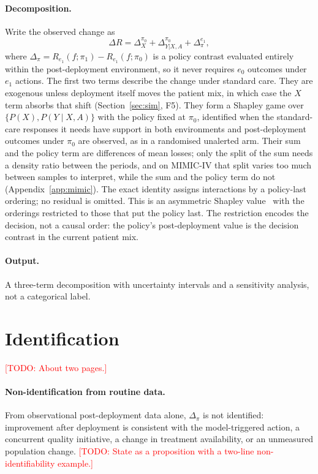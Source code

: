 \documentclass[letterpaper]{article} %
\newcommand{\todo}[1]{\textcolor{red}{[TODO: #1]}}
\begin{document}
\paragraph{Decomposition.} Write the observed change as
\begin{equation}
\Delta R = \Delta_X^{\pi_0} + \Delta_{Y|X,A}^{\pi_0}
          + \Delta_{\pi}^{e_1},
\label{eq:decomp}
\end{equation}
where $\Delta_\pi = R_{e_1}(f; \pi_1) - R_{e_1}(f; \pi_0)$ is a policy contrast
evaluated entirely within the post-deployment environment, so it never requires
$e_0$ outcomes under $e_1$ actions. The first two terms describe the change
under standard care. They are exogenous unless deployment itself moves the
patient mix, in which case the $X$ term absorbs that shift
(Section~\ref{sec:sim}, F5). They form a Shapley game over
$\{P(X), P(Y \mid X, A)\}$ with the policy fixed at $\pi_0$, identified when
the standard-care responses it needs have support in both environments and
post-deployment outcomes under $\pi_0$ are observed, as in a randomised
unalerted arm. Their sum and the policy term are differences of mean losses;
only the split of the sum needs a density ratio between the periods, and on
MIMIC-IV that split varies too much between samples to interpret, while the
sum and the policy term do not (Appendix~\ref{app:mimic}). The exact identity assigns interactions by a
policy-last ordering; no residual is omitted. This is an asymmetric Shapley
value~\citep{frye2020asymmetric} with the orderings restricted to those that
put the policy last. The restriction encodes the decision, not a causal order:
the policy's post-deployment value is the decision contrast in the current
patient mix.

\paragraph{Output.} A three-term decomposition with uncertainty intervals and a
sensitivity analysis, not a categorical label.

\section{Identification}
\label{sec:ident}

\todo{About two pages.}

\paragraph{Non-identification from routine data.} From observational
post-deployment data alone, $\Delta_\pi$ is not identified: improvement after
deployment is consistent with the model-triggered action, a concurrent quality
initiative, a change in treatment availability, or an unmeasured population
change. \todo{State as a proposition with a two-line non-identifiability
example.}
\end{document}
